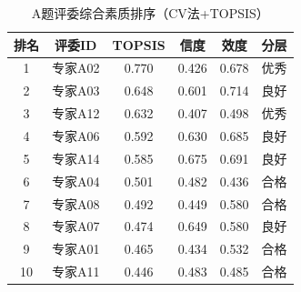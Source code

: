 \begin{table}[h]
\centering
\caption{A题评委综合素质排序（CV法+TOPSIS）}
\begin{tabular}{cccccc}
\hline
排名 & 评委ID & TOPSIS & 信度 & 效度 & 分层 \\
\hline
1 & 专家A02 & 0.770 & 0.426 & 0.678 & 优秀 \\
2 & 专家A03 & 0.648 & 0.601 & 0.714 & 良好 \\
3 & 专家A12 & 0.632 & 0.407 & 0.498 & 优秀 \\
4 & 专家A06 & 0.592 & 0.630 & 0.685 & 良好 \\
5 & 专家A14 & 0.585 & 0.675 & 0.691 & 良好 \\
6 & 专家A04 & 0.501 & 0.482 & 0.436 & 合格 \\
7 & 专家A08 & 0.492 & 0.449 & 0.580 & 合格 \\
8 & 专家A07 & 0.474 & 0.649 & 0.580 & 良好 \\
9 & 专家A01 & 0.465 & 0.434 & 0.532 & 合格 \\
10 & 专家A11 & 0.446 & 0.483 & 0.485 & 合格 \\
\hline
\end{tabular}
\end{table}
